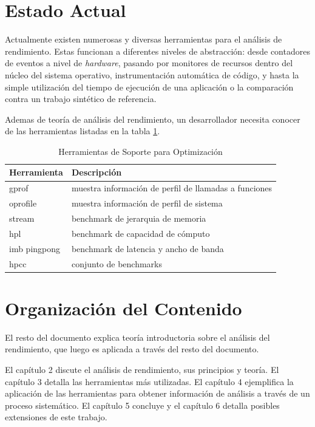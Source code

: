 \documentclass[a4paper]{report}
\begin{document}
\section{Estado Actual}

Actualmente existen numerosas y diversas herramientas para el an\'alisis de rendimiento.
Estas funcionan a diferentes niveles de abstracci\'on: desde contadores de eventos
a nivel de {\it hardware}, pasando por monitores de recursos dentro del n\'ucleo del sistema operativo,
instrumentaci\'on autom\'atica de c\'odigo, y hasta la simple utilizaci\'on del tiempo de ejecuci\'on 
de una aplicaci\'on o la comparaci\'on contra un trabajo sint\'etico de referencia.

\bigskip

Ademas de teor\'ia de an\'alisis del rendimiento, un desarrollador necesita
conocer de las herramientas listadas en la tabla \ref{table:tools}.

\begin{table}[H]
    \caption{Herramientas de Soporte para Optimizaci\'on}
    \centering
    \begin{tabular}{|l|l|}\hline
      {\bf Herramienta} & {\bf Descripci\'on} \\ \hline
      gprof & muestra informaci\'on de perfil de llamadas a funciones \\ \hline
      oprofile & muestra informaci\'on de perfil de sistema \\ \hline
      stream & benchmark de jerarquia de memoria \\ \hline
      hpl & benchmark de capacidad de c\'omputo \\ \hline
      imb pingpong & benchmark de latencia y ancho de banda \\ \hline
      hpcc & conjunto de benchmarks \\ \hline
    \end{tabular}
    \label{table:tools}
\end{table}

\section{Organizaci\'on del Contenido}

El resto del documento explica teor\'ia introductoria sobre el an\'alisis del rendimiento, que luego es
aplicada a trav\'es del resto del documento.

\bigskip

El cap\'itulo 2 discute el an\'alisis de rendimiento, sus
principios y teor\'ia. El cap\'itulo 3 detalla las herramientas m\'as
utilizadas. El cap\'itulo 4 ejemplifica la aplicaci\'on de las herramientas
para obtener informaci\'on de an\'alisis a trav\'es de un proceso sistem\'atico.
El cap\'itulo 5 concluye y el cap\'itulo 6 detalla posibles extensiones de este trabajo.
\end{document}
